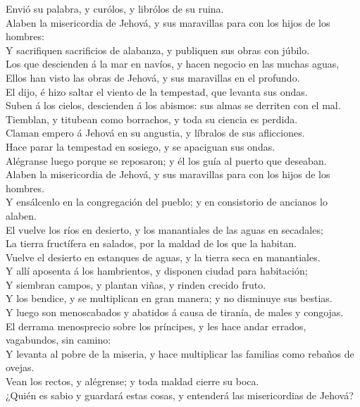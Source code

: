  Envió su palabra, y curólos, y librólos de su ruina.\\
 Alaben la misericordia de Jehová, y sus maravillas para
con los hijos de los hombres:\\
 Y sacrifiquen sacrificios de alabanza, y publiquen sus
obras con júbilo.\\
 Los que descienden á la mar en navíos, y hacen negocio
en las muchas aguas,\\
 Ellos han visto las obras de Jehová, y sus maravillas en
el profundo.\\
 El dijo, é hizo saltar el viento de la tempestad, que
levanta sus ondas.\\
 Suben á los cielos, descienden á los abismos: sus almas
se derriten con el mal.\\
 Tiemblan, y titubean como borrachos, y toda su ciencia
es perdida.\\
 Claman empero á Jehová en su angustia, y líbralos de sus
aflicciones.\\
 Hace parar la tempestad en sosiego, y se apaciguan sus
ondas.\\
 Alégranse luego porque se reposaron; y él los guía al
puerto que deseaban.\\
 Alaben la misericordia de Jehová, y sus maravillas para
con los hijos de los hombres.\\
 Y ensálcenlo en la congregación del pueblo; y en
consistorio de ancianos lo alaben.\\
 El vuelve los ríos en desierto, y los manantiales de las
aguas en secadales;\\
 La tierra fructífera en salados, por la maldad de los
que la habitan.\\
 Vuelve el desierto en estanques de aguas, y la tierra
seca en manantiales.\\
 Y allí aposenta á los hambrientos, y disponen ciudad
para habitación;\\
 Y siembran campos, y plantan viñas, y rinden crecido
fruto.\\
 Y los bendice, y se multiplican en gran manera; y no
disminuye sus bestias.\\
 Y luego son menoscabados y abatidos á causa de tiranía,
de males y congojas.\\
 El derrama menosprecio sobre los príncipes, y les hace
andar errados, vagabundos, sin camino:\\
 Y levanta al pobre de la miseria, y hace multiplicar las
familias como rebaños de ovejas.\\
 Vean los rectos, y alégrense; y toda maldad cierre su
boca.\\
 ¿Quién es sabio y guardará estas cosas, y entenderá las
misericordias de Jehová?

